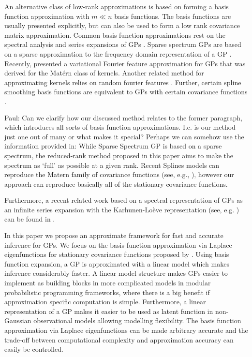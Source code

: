 \documentclass[onecolumn,a4paper,11pt]{article}
\begin{document}
An alternative class of low-rank approximations is based on forming a basis function approximation with $m \ll n$ basis functions. The basis functions are usually presented explicitly, but can also be used to form a low rank covariance matrix approximation. Common basis function approximations rest on the spectral analysis and series expansions of GPs \citep{loeve1977probability,trees1968detection,adler1981geometry,cramer2013stationary}.
Sparse spectrum GPs are based on a sparse approximation to the frequency domain representation of a GP \citep{lazaro2010sparse,quia2010sparse,gal2015improving}. Recently, \cite{hensman2017variational} presented a variational Fourier feature approximation for GPs that was derived for the Mat{\'e}rn class of kernels. Another related method for approximating kernels relies on random fourier features \citep{rahimi2008random,rahimi2009weighted}.
Further, certain spline smoothing basis functions are equivalent to GPs with certain covariance functions \citep{wahba1990spline,Furrer+Nychka:2007}.

{\color{blue} Paul: Can we clarify how our discussed method relates to the former paragraph,
which introduces all sorts of basis function approximations. I.e. is our method
just one out of many or what makes it special? Perhaps we can somehow use the information provided
in: While Sparse Spectrum GP is based on a sparse spectrum, the reduced-rank method proposed in this paper aims to make the spectrum as ‘full’ as possible at a given rank. Recent Splines models can reproduce the Matern family of covariance functions (see, e.g., \cite{wood2003thin}), however our approach can reproduce basically all of the stationary covariance functions.}

Furthermore, a recent related work based on a spectral representation of GPs as an infinite series expansion with the Karhunen-Loève representation (see, e.g. \cite{grenander1981abstract}) can be found in \cite{JSSv090i10}.

In this paper we propose an approximate framework for fast and accurate inference for GPs. We focus on the basis function approximation via Laplace eigenfunctions for stationary covariance functions proposed by \citet{solin2018hilbert}. Using basis function expansion, a GP is approximated with a linear model which makes inference considerably faster. A linear model structure makes GPs easier to implement as building blocks in more complicated models in modular probabilistic programming frameworks, where there is a big benefit if approximation specific computation is simple. Furthermore, a linear representation of a GP makes it easier to be used as latent function
in non-Gaussian observational models allowing modelling flexibility. The basis function approximation via Laplace eigenfunctions can be made arbitrary accurate and the trade-off between computational complexity and approximation accuracy can easily be controlled.
\end{document}
